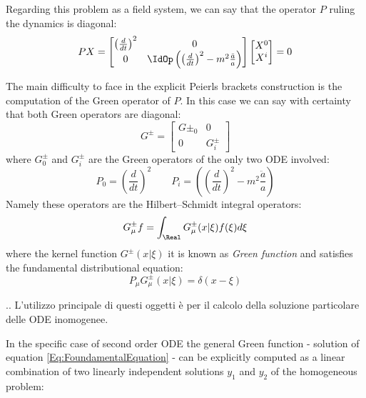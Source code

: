 \documentclass[Main]{subfiles}
\begin{document}
			Regarding this problem as a field system, we can say that the operator $P$ ruling the dynamics is diagonal:
			\begin{displaymath}
				P X =
				 \begin{bmatrix}  
				 \left(\frac{d}{dt}\right)^2 & 0 \\
				 0 & \IdOp \left( \left(\frac{d}{dt}\right)^2 - m^2 \frac{\ddot{a}}{a} \right)
				 \end{bmatrix}
				 \begin{bmatrix} X^0 \\ X^i  \end{bmatrix}
				 = 0
			\end{displaymath}
			
			The main difficulty to face in the explicit Peierls brackets construction is the computation of the Green operator of $P$.
			In this case we can say with certainty that both Green operators are diagonal:
			\begin{displaymath}
				G^\pm =
				 \begin{bmatrix}  
				 G\pm_0 & 0 \\
				 0 & G^\pm_i
				 \end{bmatrix}
			\end{displaymath}		
			where $G^\pm_0$ and $G^\pm_i$ are the Green operators of the only two ODE involved:
			\begin{displaymath}
				P_0 = \left(\frac{d}{dt}\right)^2 \qquad P_i=\left( \left(\frac{d}{dt}\right)^2 - m^2 \frac{\ddot{a}}{a} \right)
			\end{displaymath}
			Namely these operators are the Hilbert–Schmidt integral operators:
			\begin{displaymath}
				G^\pm_\mu f = \int_\Real G^\pm_\mu( x \vert \xi ) f(\xi) d\xi
			\end{displaymath}
			where the kernel function $G^\pm( x \vert \xi ) $ it is known as \emph{Green function} and satisfies the fundamental distributional equation:
			\begin{equation}\label{Eq:FoundamentalEquation}
				P_\mu G^\pm_\mu( x | \xi) = \delta( x - \xi)
			\end{equation}
\ifToninus
	\begin{remark}
		\danger .. L'utilizzo principale di questi oggetti è per il calcolo della soluzione particolare delle ODE inomogenee.
	\end{remark}
\fi			
			In the specific case of second order ODE the general Green function  - solution of equation \ref{Eq:FoundamentalEquation} - can be explicitly computed as a linear combination of two linearly independent solutions $y_1$ and $y_2$ of the homogeneous problem:
\end{document}
